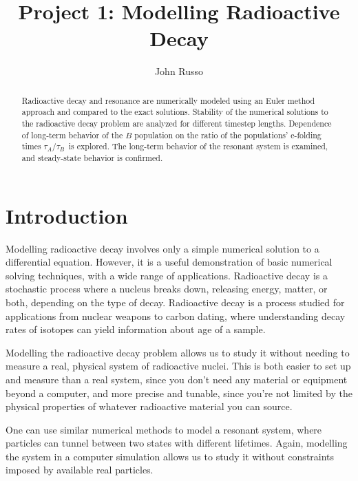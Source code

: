 \documentclass[pra,twocolumn,showpacs,amsmath,amssymb]{revtex4-1}
\begin{document}
\newcommand{\trel}{$\tau_A / \tau_B$}

\title{Project 1: Modelling Radioactive Decay}


\author{John Russo}

\begin{abstract}
Radioactive decay and resonance are numerically modeled using an Euler method
approach and compared to the exact solutions.
Stability of the numerical solutions to the radioactive decay problem are analyzed
for different timestep lengths. Dependence of long-term behavior of the $B$
population on the ratio of the populations' e-folding times \trel~is explored.
The long-term behavior of the resonant system is examined, and steady-state
behavior is confirmed.
\end{abstract}



\maketitle





\section{Introduction} \label{sec:intro}

Modelling radioactive decay involves only a simple numerical solution to a
differential equation. However, it is a useful demonstration of basic numerical
solving techniques, with a wide range of applications.
Radioactive decay is a stochastic process where a nucleus breaks down, releasing
energy, matter, or both, depending on the type of decay.\cite{decaypage}
Radioactive decay is a process studied for applications from nuclear weapons to
carbon dating, where understanding decay rates of isotopes can yield information
about age of a sample.

Modelling the radioactive decay problem allows us to study it without needing
to measure a real, physical system of radioactive nuclei. This is both
easier to set up and measure than a real system, since you don't need any material
or equipment beyond a computer, and more precise and tunable, since you're
not limited by the physical properties of whatever radioactive material you
can source.

One can use similar numerical methods to model a resonant system, where particles
can tunnel between two states with different lifetimes. Again, modelling the
system in a computer simulation allows us to study it without constraints
imposed by available real particles.
\end{document}
